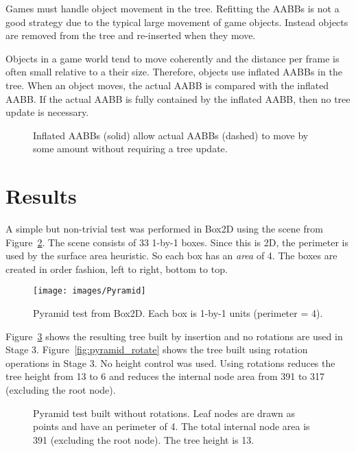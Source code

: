 \documentclass{article}
\begin{document}
Games must handle object movement in the tree. Refitting the AABBs is not a good strategy due to the typical large movement of game objects. Instead objects are removed from the tree and re-inserted when they move. 

Objects in a game world tend to move coherently and the distance per frame is often small relative to a their size. Therefore, objects use inflated AABBs in the tree. When an object moves, the actual AABB is compared with the inflated AABB. If the actual AABB is fully contained by the inflated AABB, then no tree update is necessary.

\begin{figure}
	\begin{center}
		
	\end{center}
	\caption{Inflated AABBs (solid) allow actual AABBs (dashed) to move by some amount without requiring a tree update. }
	\label{fig:inflated}
\end{figure}

\section{Results}

A simple but non-trivial test was performed in Box2D using the scene from Figure~\ref{fig:pyramid}. The scene consists of 33 1-by-1 boxes. Since this is 2D, the perimeter is used by the surface area heuristic. So each box has an \emph{area} of 4. The boxes are created in order fashion, left to right, bottom to top.

\begin{figure}
	\begin{center}
		\texttt{[image: images/Pyramid]}
	\end{center}
	\caption{ Pyramid test from Box2D. Each box is 1-by-1 units (perimeter = 4).}
	\label{fig:pyramid}
\end{figure}

Figure~\ref{fig:pyramid_base} shows the resulting tree built by insertion and no rotations are used in Stage 3. Figure~\ref{fig:pyramid_rotate} shows the tree built using rotation operations in Stage 3. No height control was used. Using rotations reduces the tree height from 13 to 6 and reduces the internal node area from 391 to 317 (excluding the root node).

\begin{figure}
	\begin{center}
		
	\end{center}
	\caption{ Pyramid test built without rotations. Leaf nodes are drawn as points and have an perimeter of 4. The total internal node area is 391 (excluding the root node). The tree height is 13. }
	\label{fig:pyramid_base}
\end{figure}
\end{document}
